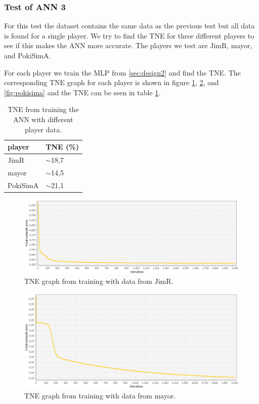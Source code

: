 \subsubsection{Test of ANN 3}
\label{sec:ann-test3}
For this test the dataset contains the same data as the previous test but all data is found for a single player. We try to find the TNE for three different players to see if this makes the ANN more accurate. The players we test are JimR, mayor, and PokiSimA.

For each player we train the MLP from \ref{sec:design2} and find the TNE. The corresponding TNE graph for each player is shown in figure \ref{fig:jimr}, \ref{fig:mayor}, and \ref{fig:pokisima} and the TNE can be seen in table \ref{tab:tneg3}.

\vspace{4mm}
\begin{table}[H]
\center
\begin{tabular}{ | l | l |}
  \hline
  player & TNE (\%) \\
  \hline
  JimR & $\sim$18,7 \\
  mayor & $\sim$14,5 \\
  PokiSimA & $\sim$21,1 \\
  \hline
\end{tabular}
\caption{TNE from training the ANN with different player data.\label{tab:tneg3}}
\end{table}
\vspace{4mm}

\begin{figure}[H]
  \center
    \includegraphics[scale=0.5]{images/nn/JimR.png}
  \caption{TNE graph from training with data from JimR.\label{fig:jimr}}
\end{figure}

\begin{figure}[H]
  \center
    \includegraphics[scale=0.5]{images/nn/mayor.png}
  \caption{TNE graph from training with data from mayor.\label{fig:mayor}}
\end{figure}

